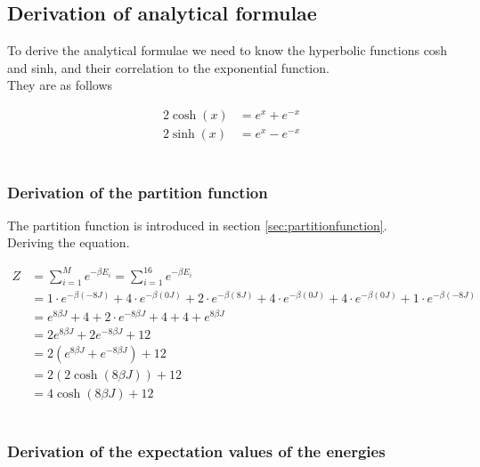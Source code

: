 \documentclass{article}
\begin{document}
\subsection{Derivation of analytical formulae}

To derive the analytical formulae we need to know the hyperbolic functions cosh and sinh, and their correlation to the exponential function. \\

They are as follows

\begin{align*}
    2 \cosh (x) &= e^x + e^{-x} \\
    2 \sinh (x) &= e^x - e^{-x}
\end{align*} \\


\subsubsection{Derivation of the partition function} \label{sec:derivationpartitionfunction}

The partition function is introduced in section \ref{sec:partitionfunction}. \\

Deriving the equation.

\begin{align*}
  Z &= \sum_{i=1} ^{M} e^{- \beta E_i} = \sum_{i=1} ^{16} e^{- \beta E_i} \\
  &= 1 \cdot e^{- \beta (-8J)} + 4 \cdot e^{- \beta (0J)} + 2 \cdot e^{- \beta (8J)} + 4 \cdot e^{- \beta (0J)}
  + 4 \cdot e^{- \beta (0J)} + 1 \cdot e^{- \beta (-8J)} \\
  &= e^{8 \beta J} + 4 + 2 \cdot e^{-8 \beta J} + 4 + 4 + e^{8 \beta J} \\
  &= 2 e^{8 \beta J } + 2 e^{-8 \beta J} + 12 \\
  &= 2 \left( e^{8 \beta J} + e^{- 8 \beta J} \right) + 12 \\
  &= 2 \left( 2 \cosh(8 \beta J) \right) + 12 \\
  &= 4 \cosh(8 \beta J) + 12
\end{align*} \\


\subsubsection{Derivation of the expectation values of the energies} \label{sec:derivationenergies}
\end{document}
